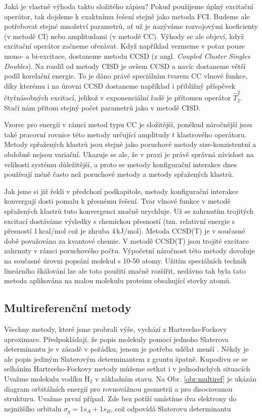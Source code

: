 Jaká je vlastně výhoda takto složitého zápisu?
Pokud použijeme úplný excitační operátor, tak dojdeme k exaktnímu řešení stejně jako metoda FCI. Budeme ale potřebovat stejné množství parametrů, ať už je nazýváme rozvojovými koeficienty (v metodě CI) nebo amplitudami (v metodě CC).
Výhody se ale objeví, když excitační operátor začneme ořezávat. Když například vezmeme v potaz pouze mono- a bi-excitace, dostaneme metodu CCSD  (z angl. \textit{Coupled Cluster Singles Doubles}).
Na rozdíl od metody CISD je ovšem CCSD  a navíc dostaneme větší podíl korelační energie.
To je dáno právě speciálním tvarem CC vlnové funkce, díky kterému i na úrovni CCSD dostaneme například i přibližný příspěvek čtyřnásobných excitací, jelikož v exponenciální řadě je přítomen operátor $\hat{T}_2^2$. Stačí nám přitom stejný počet parametrů jako v metodě CISD.

Vzorec pro energii v rámci metod typu CC je složitější, poněkud náročnější jsou také pracovní rovnice této metody určující amplitudy $t$ klastrového operátoru. Metody spřažených klastrů jsou stejně jako poruchové metody size-konzistentní a obdobně nejsou variační. Ukazuje se ale, že v praxi je právě správná závislost na velikosti systému důležitější, a proto se metody konfigurační interakce dnes používají méně často než poruchové metody a metody spřažených klastrů.

Jak jsme si již řekli v předchozí podkapitole, metody konfigurační interakce konvergují dosti pomalu k přesnému řešení. Tvar vlnové funkce v metodě spřažených klastrů tuto konvergenci značně urychluje. Už se zahrnutím trojitých excitací dostáváme výsledky s chemickou přesností (tzn. relativní energie s přesností 1\,kcal/mol což je zhruba 4\,kJ/mol).
Metoda CCSD(T) je v současné době považována za  kvantové chemie. V metodě CCSD(T) jsou trojité excitace zahrnuty v rámci poruchového počtu. Výpočetní náročnost této metody dovoluje na současné úrovni popsání molekul s 10-50
atomy. Užitím speciálních technik lineárního škálování lze ale toto použití značně rozšířit, nedávno tak byla tato metoda aplikována na malou molekulu proteinu obsahující stovky atomů. 

\subsection{Multireferenční metody}

Všechny metody, které jsme probrali výše, vychází z Hartreeho-Fockovy aproximace. Předpokládají, že popis molekuly pomocí jednoho Slaterova determinantu je v zásadě v pořádku, jenom je potřeba udělat menší . Někdy je ale popis jediným Slaterovým determinantem z gruntu špatně. Kupodivu se se selháním Hartreeho-Fockovy metody můžeme setkat i v jednoduchých situacích Uvažme molekulu vodíku H$_2$ v základním stavu. Na Obr. \ref{obr:multiref} je ukázán diagram orbitálních energií pro rovnovážnou geometrii a pro disociovanou strukturu. Uvažme první případ. Zde bez potíží umístíme dva elektrony do nejnižšího orbitalu $\sigma_g=1s_A+1s_B$, což odpovídá Slaterovu determinantu

